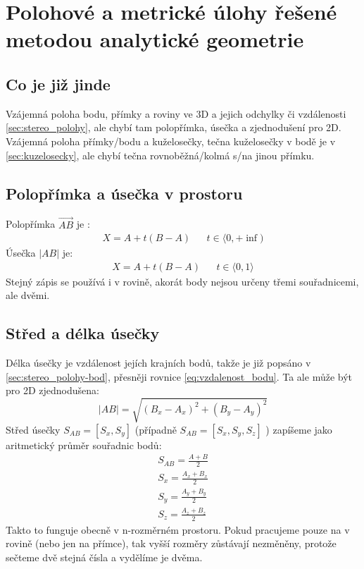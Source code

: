 \documentclass[12pt]{article}
\begin{document}
\section{Polohové a metrické úlohy řešené metodou analytické geometrie}
\label{sec:22}
\subsection{Co je již jinde}
Vzájemná poloha bodu, přímky a roviny ve 3D a jejich odchylky či vzdálenosti \ref{sec:stereo_polohy}, ale chybí tam polopřímka, úsečka a zjednodušení pro 2D.\\
Vzájemná poloha přímky/bodu a kuželosečky, tečna kuželosečky v bodě je v \ref{sec:kuzelosecky}, ale chybí tečna rovnoběžná/kolmá s/na jinou přímku.
\subsection{Polopřímka a úsečka v prostoru}
\label{sec:polohy-poloprimka}
Polopřímka $\overrightarrow{AB}$ je :
\begin{align}
X = A + t(B-A) && t \in \langle 0, + \inf)
\end{align}
Úsečka $|AB|$ je:
\begin{align}
X = A + t(B-A) && t\in \langle 0 , 1\rangle
\end{align}
Stejný zápis se používá i v rovině, akorát body nejsou určeny třemi souřadnicemi, ale dvěmi.
\subsection{Střed a délka úsečky}
\label{sec:stred-usecky}
Délka úsečky je vzdálenost jejích krajních bodů, takže je již popsáno v \ref{sec:stereo_polohy-bod}, přesněji rovnice \ref{eq:vzdalenost_bodu}. Ta ale může být pro 2D zjednodušena:
\begin{equation}
|AB| = \sqrt{\left(B_x -A_x \right)^2 + \left(B_y-A_y\right)^2}
\end{equation}
Střed úsečky $S_{AB} = [S_x, S_y]$ (případně $S_{AB} = [S_x, S_y, S_z]$ ) zapíšeme jako aritmetický průměr souřadnic bodů:
\begin{align}
S_{AB} = \frac{A + B}{2}\\
S_x = \frac{A_x + B_x}{2}\\
S_y = \frac{A_y + B_y}{2}\\
S_z = \frac{A_z + B_z}{2}
\end{align}
Takto to funguje obecně v n-rozměrném prostoru. Pokud pracujeme pouze na v rovině (nebo jen na přímce), tak vyšší rozměry zůstávají nezměněny, protože sečteme dvě stejná čísla a vydělíme je dvěma.
\end{document}
